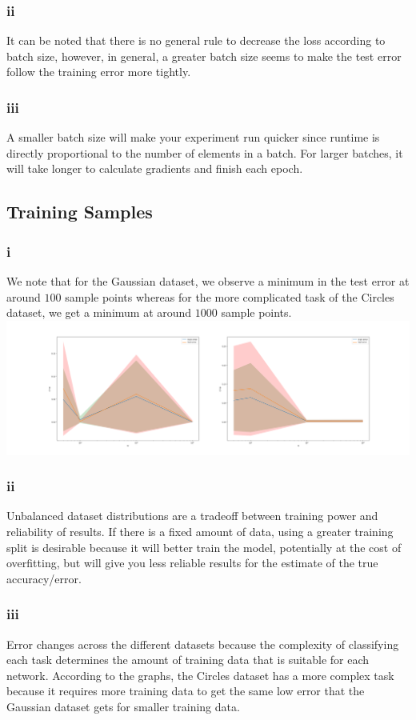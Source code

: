 \documentclass{article}
\begin{document}
\subsubsection{ii}
It can be noted that there is no general rule to decrease the loss according to batch size, however, in general, a greater batch size seems to make the test error follow the training error more tightly.
\subsubsection{iii}
A smaller batch size will make your experiment run quicker since runtime is directly proportional to the number of elements in a batch. For larger batches, it will take longer to calculate gradients and finish each epoch.

\subsection{Training Samples}
\subsubsection{i}
We note that for the Gaussian dataset, we observe a minimum in the test error at around $100$ sample points whereas for the more complicated task of the Circles dataset, we get a minimum at around $1000$ sample points.\\
\includegraphics*[width=16cm]{training_size_differences}
\subsubsection{ii}
Unbalanced dataset distributions are a tradeoff between training power and reliability of results. If there is a fixed amount of data, using a greater training split is desirable because it will better train the model, potentially at the cost of overfitting, but will give you less reliable results for the estimate of the true accuracy/error.
\subsubsection{iii}
Error changes across the different datasets because the complexity of classifying each task determines the amount of training data that is suitable for each network. According to the graphs, the Circles dataset has a more complex task because it requires more training data to get the same low error that the Gaussian dataset gets for smaller training data.
\end{document}
